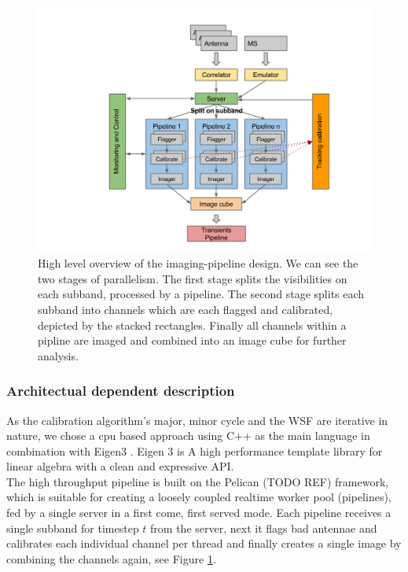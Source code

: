 \documentclass{aa}
\begin{document}
\begin{figure}[tbh]
\includegraphics[width=1\columnwidth]{Figs/pipeline-design}\caption{\label{fig:pipeline}
High level overview of the imaging-pipeline design. We can see the two stages
of parallelism. The first stage splits the visibilities on each subband,
processed by a pipeline.  The second stage splits each subband into channels
which are each flagged and calibrated, depicted by the stacked rectangles.
Finally all channels within a pipline are imaged and combined into an image
cube for further analysis.}
\end{figure}

\subsubsection{Architectual dependent description}
As the calibration algorithm's major, minor cycle and the WSF are iterative in
nature, we chose a cpu based approach using C++ as the main language in
combination with Eigen3 \citep{eigenweb}. Eigen 3 is A high performance
template library for linear algebra with a clean and expressive API. \\
The high throughput pipeline is built on the Pelican (TODO REF)
framework, which is suitable for creating a loosely coupled realtime worker
pool (pipelines), fed by a single server in a first come, first served mode.
Each pipeline receives a single subband for timestep $t$ from the server, next
it flags bad antennae and calibrates each individual channel per thread and
finally creates a single image by combining the channels again, see Figure
\ref{fig:pipeline}.
\end{document}
